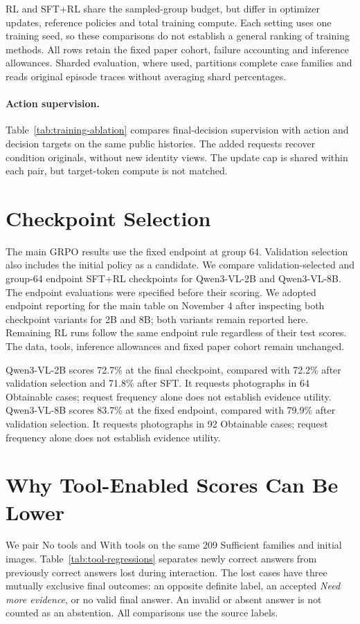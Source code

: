 RL and SFT+RL share the sampled-group budget, but differ in optimizer updates, reference policies and total training compute. Each setting uses one training seed, so these comparisons do not establish a general ranking of training methods. All rows retain the fixed paper cohort, failure accounting and inference allowances. Sharded evaluation, where used, partitions complete case families and reads original episode traces without averaging shard percentages.

\paragraph{Action supervision.}
Table~\ref{tab:training-ablation} compares final-decision supervision with action and decision targets on the same public histories.
The added requests recover condition originals, without new identity views.
The update cap is shared within each pair, but target-token compute is not matched.

\section{Checkpoint Selection}
The main GRPO results use the fixed endpoint at group 64. Validation selection also includes the initial policy as a candidate. We compare validation-selected and group-64 endpoint SFT+RL checkpoints for Qwen3-VL-2B and Qwen3-VL-8B. The endpoint evaluations were specified before their scoring. We adopted endpoint reporting for the main table on November 4 after inspecting both checkpoint variants for 2B and 8B; both variants remain reported here. Remaining RL runs follow the same endpoint rule regardless of their test scores. The data, tools, inference allowances and fixed paper cohort remain unchanged.

Qwen3-VL-2B scores 72.7\% at the final checkpoint, compared with 72.2\% after validation selection and 71.8\% after SFT. It requests photographs in 64 Obtainable cases; request frequency alone does not establish evidence utility.
Qwen3-VL-8B scores 83.7\% at the fixed endpoint, compared with 79.9\% after validation selection. It requests photographs in 92 Obtainable cases; request frequency alone does not establish evidence utility.


\section{Why Tool-Enabled Scores Can Be Lower}
\label{sec:tool-regressions}
We pair No tools and With tools on the same 209 Sufficient families and initial images.
Table~\ref{tab:tool-regressions} separates newly correct answers from previously correct answers lost during interaction.
The lost cases have three mutually exclusive final outcomes: an opposite definite label, an accepted \emph{Need more evidence}, or no valid final answer.
An invalid or absent answer is not counted as an abstention.
All comparisons use the source labels.

